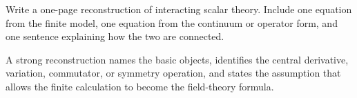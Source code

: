 \begin{exercise}
Write a one-page reconstruction of interacting scalar theory.  Include one equation from the finite model, one equation from the continuum or operator form, and one sentence explaining how the two are connected.
\begin{answer}
A strong reconstruction names the basic objects, identifies the central derivative, variation, commutator, or symmetry operation, and states the assumption that allows the finite calculation to become the field-theory formula.
\end{answer}
\end{exercise}
